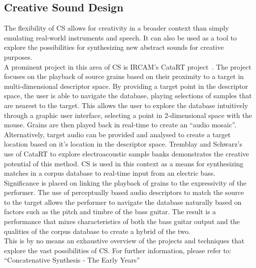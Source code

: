 \documentclass[titlepage]{scrartcl}
\begin{document}
    \subsection*{Creative Sound Design}
    The flexibility of CS allows for creativity in a broader context than simply
    emulating real-world instruments and speech. It can also be used as a tool
    to explore the possibilities for synthesizing new abstract sounds for
    creative purposes.\\
    A prominent project in this area of CS is IRCAM's CataRT
    project~\parencite{Schwarz2006a}. The project focuses on the playback of
    source grains based on their proximity to a target in multi-dimensional
    descriptor space.  By providing a target point in the descriptor space, the
    user is able to navigate the database, playing selections of samples that
    are nearest to the target. This allows the user to explore the database
    intuitively through a graphic user interface, selecting a point in
    2-dimensional space with the mouse. Grains are then played back in
    real-time to create an ``audio mosaic''.\\
    Alternatively, target audio can be provided and analysed to create a target
    location based on it's location in the descriptor space.  Tremblay and
    Schwarz's~\citeyearpar{Tremblay2010} use of CataRT to explore
    electroacoustic sample banks demonstrates the creative potential of this
    method. CS is used in this context as a means for synthesizing matches in a
    corpus database to real-time input from an electric bass.  Significance is
    placed on linking the playback of grains to the expressivity of the
    performer. The use of perceptually based audio descriptors to match the
    source to the target allows the performer to navigate the database
    naturally based on factors such as the pitch and timbre of the bass
    guitar. The result is a performance that mixes characteristics of both the
    bass guitar output and the qualities of the corpus database to create a
    hybrid of the two.\\

    This is by no means an exhaustive overview of the projects and techniques
    that explore the vast possibilities of CS. For further information, please
    refer to: ``Concatenative Synthesis - The Early
    Years''~\parencite{Schwarz2006b}
\end{document}
